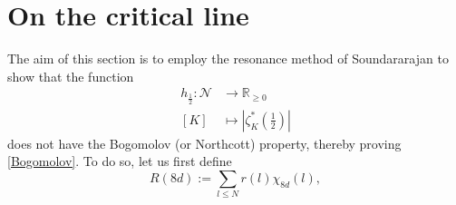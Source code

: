 \documentclass[10pt,a4paper]{amsart}
\theoremstyle{plain}
\theoremstyle{definition}
\theoremstyle{remark}
\begin{document}

    \section{On the critical line}
    \label{sec:cricial_center}
    The aim of this section is to employ the resonance method of Soundararajan \cite{Soundararajan_2008} to show that the function 
    \[
        \begin{aligned}
            h_{\frac{1}{2}}\colon \mathcal{N} &\to \mathbb{R}_{\geq 0} \\
            [K] &\mapsto \left\lvert \zeta_K^\ast\left(\frac{1}{2}\right) \right\rvert
        \end{aligned}
    \]
    does not have the Bogomolov (or Northcott) property, thereby proving \cref{Bogomolov}.
    To do so, let us first define 
    \begin{equation}\label{resonator}
     R(8d) := \sum_{l \leq N} r(l) \chi_{8d}(l),   
    \end{equation}
\end{document}
